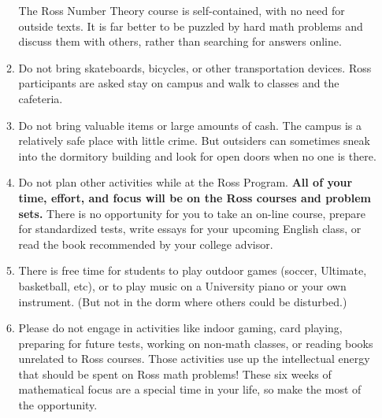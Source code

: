 \documentclass[11pt]{ross}
\begin{document}
\begin{enumerate}[label=(\arabic*),itemsep=2em,topsep=-1em]
\begin{enumerate}[label=(\alph*),itemsep=0.5em,topsep=0em]
    The Ross Number Theory course is self-contained, with no need for 
    outside texts.  It is far better to be puzzled by hard math problems 
    and discuss them with others, rather than searching for answers online.
  \item Do not bring skateboards, bicycles, or other transportation devices.
    Ross participants are asked stay on campus and walk to classes and the cafeteria.
  \item Do not bring valuable items or large amounts of cash.  The
    campus is a relatively safe place with little crime.  But
    outsiders can sometimes sneak into the dormitory building and look
    for open doors when no one is there.
  \item Do not plan other activities while at the Ross Program. \textbf{All of 
    your time, effort, and focus will be on the Ross courses and problem 
    sets.}  There is no opportunity for you to take an on-line course, 
    prepare for standardized tests, write essays for your upcoming English 
    class, or read the book recommended by your college advisor.
  \item There is free time for students to play outdoor games (soccer, Ultimate, 
    basketball, etc), or to play music on a University piano or your own 
    instrument. (But not in the dorm where others could be disturbed.)
   \item Please do not engage in activities like indoor gaming, card
playing, preparing for future tests, working on non-math classes, or
reading books unrelated to Ross courses. Those activities use up the
intellectual energy that should be spent on Ross math problems!  These
six weeks of mathematical focus are a special time in your life, so
make the most of the opportunity.
\end{enumerate}
\end{enumerate}
\end{document}
